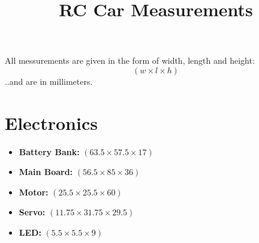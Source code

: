\documentclass{article}
\title{RC Car Measurements}
\begin{document}
\maketitle

All messurements are given in the form of width, length and height:
$$
(w \times l \times h)
$$
..and are in millimeters.

\section{Electronics}

\begin{itemize}
\item {\bf Battery Bank:} $(63.5 \times 57.5 \times 17)$
\item {\bf Main Board:} $( 56.5 \times 85 \times 36)$
\item {\bf Motor:} $( 25.5 \times 25.5 \times 60)$
\item {\bf Servo:} $( 11.75 \times 31.75 \times 29.5)$
\item {\bf LED:} $( 5.5 \times 5.5 \times 9)$
\end{itemize}
\end{document}
